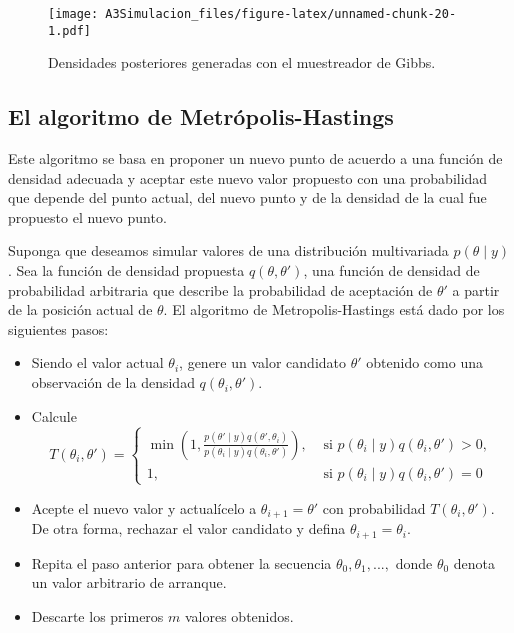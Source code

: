 \documentclass[
  12pt,
  spanish,
]{book}
\providecommand{\tightlist}{%
  \setlength{\itemsep}{0pt}\setlength{\parskip}{0pt}}
\theoremstyle{definition}
\theoremstyle{definition}
\theoremstyle{definition}
\theoremstyle{definition}
\theoremstyle{remark}
\begin{document}
\begin{figure}
\centering
\texttt{[image: A3Simulacion\_files/figure-latex/unnamed-chunk-20-1.pdf]}
\caption{\label{fig:unnamed-chunk-20}Densidades posteriores generadas con el muestreador de Gibbs.}
\end{figure}

\hypertarget{el-algoritmo-de-metruxf3polis-hastings}{%
\subsection{El algoritmo de Metrópolis-Hastings}\label{el-algoritmo-de-metruxf3polis-hastings}}

Este algoritmo se basa en proponer un nuevo punto de acuerdo a una función de densidad adecuada y aceptar este nuevo valor propuesto con una probabilidad que depende del punto actual, del nuevo punto y de la densidad de la cual fue propuesto el nuevo punto.

Suponga que deseamos simular valores de una distribución multivariada \(p(\theta \mid y)\). Sea la función de densidad propuesta \(q(\theta, \theta')\), una función de densidad de probabilidad arbitraria que
describe la probabilidad de aceptación de \(\theta'\) a partir de la posición actual de \(\theta\). El algoritmo de Metropolis-Hastings está dado por los siguientes pasos:

\begin{itemize}
\tightlist
\item
  Siendo el valor actual \(\theta_i\), genere un valor candidato \(\theta'\) obtenido como una observación de la densidad \(q(\theta_i, \theta')\).
\item
  Calcule
  \begin{equation*}
  T(\theta_i, \theta') =
  \begin{cases}
  \min \left(1,  \frac{p(\theta' \mid  y)q(\theta', \theta_i)}{p(\theta_i \mid  y)q(\theta_i, \theta')} \right),
  & \text{  si   } p(\theta_i \mid  y)q(\theta_i, \theta') > 0,\\ 
  1, & \text{  si   }
  p(\theta_i \mid y)q(\theta_i, \theta') = 0
  \end{cases}
  \end{equation*}
\item
  Acepte el nuevo valor y actualícelo a \(\theta_{i+1}=\theta'\) con probabilidad \(T(\theta_i, \theta')\). De otra forma, rechazar el valor candidato y defina \(\theta_{i+1}=\theta_i\).

  \item

  Repita el paso anterior para obtener la secuencia \(\theta_0,\theta_1,...,\)
  donde \(\theta_0\) denota un valor arbitrario de arranque.

  \item

  Descarte los primeros \(m\) valores obtenidos.
\end{itemize}
\end{document}
